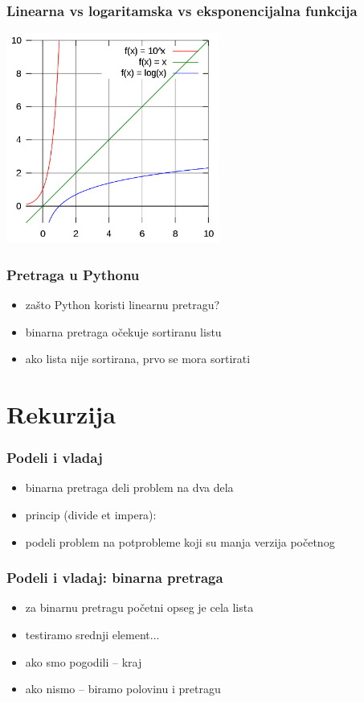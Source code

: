 \documentclass[utf8,compress,aspectratio=169]{beamer}
\begin{document}
\begin{frame}[fragile]
  \frametitle{Linearna vs logaritamska vs eksponencijalna funkcija}
  \begin{center}
    \includegraphics[width=7cm]{pic25}
  \end{center}
\end{frame}

\begin{frame}[fragile]
  \frametitle{Pretraga u Pythonu}
  \begin{itemize}
    \item zašto Python koristi linearnu pretragu?
    \item binarna pretraga očekuje sortiranu listu
    \item ako lista nije sortirana, prvo se mora sortirati
  \end{itemize}
\end{frame}

\section[Rekurzija]{Rekurzija}

\begin{frame}[fragile]
  \frametitle{Podeli i vladaj}
  \begin{itemize}
    \item binarna pretraga deli problem na dva dela
    \item princip  (divide et impera):
    \item podeli problem na potprobleme koji su manja verzija početnog
  \end{itemize}
\end{frame}

\begin{frame}[fragile]
  \frametitle{Podeli i vladaj: binarna pretraga}
  \begin{itemize}
    \item za binarnu pretragu početni opseg je cela lista
    \item testiramo srednji element...
    \item ako smo pogodili -- kraj
    \item ako nismo -- biramo polovinu i  pretragu
  \end{itemize}
\end{frame}
\end{document}
